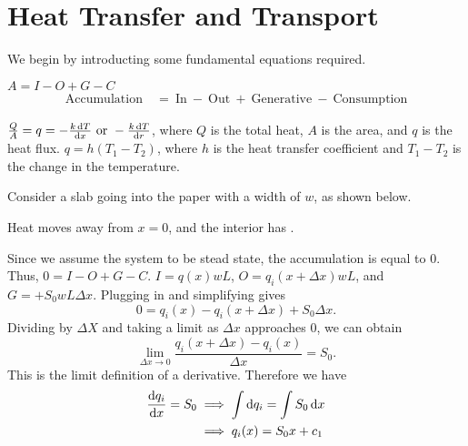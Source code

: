 \chapter{Heat Transfer and Transport}

We begin by introducting some fundamental equations required.
\begin{theorem}
    $A = I - O + G - C$
    \begin{align*}
        \text{Accumulation}~&=~\text{In}~-~\text{Out}~+~\text{Generative}~-~\text{Consumption}
    \end{align*}
\end{theorem}
\begin{theorem}
    $\frac{Q}{A} = q = -\frac{k \dif T}{\dif x} ~\text{or}~-\frac{k \dif T}{\dif r}$,
    where $Q$ is the total heat, $A$ is the area, and $q$ is the heat flux.
    $q=h(T_1-T_2)$, where $h$ is the heat transfer coefficient and $T_1-T_2$ is
    the change in the temperature.
\end{theorem}

\begin{example}
    Consider a slab going into the paper with a width of $w$, as shown below.

    Heat moves away from $x=0$, and the interior has $.$
\end{example}
Since we assume the system to be stead state, the accumulation is equal to $0$.
Thus, $0 = I-O+G-C$. $I=q(x)wL$, $O=q_i(x+\Delta x)wL$, and $G=+S_0wL\Delta x$.
Plugging in and simplifying gives $$0=q_i(x)-q_i(x+\Delta x)+S_0 \Delta x.$$
Dividing by $\Delta X$ and taking a limit as $\Delta x$ approaches $0$, we can obtain
$$\lim_{\Delta x \rightarrow 0} \frac{q_i(x+\Delta x) - q_i(x)}{\Delta x} = S_0.$$
This is the limit definition of a derivative. Therefore we have
\begin{align*}
    \frac{\dif q_i}{\dif x} = S_0 &\implies \int \dif q_i = \int S_0 \dif x \\
                                  &\implies q_i(x) = S_0x+c_1
\end{align*}

